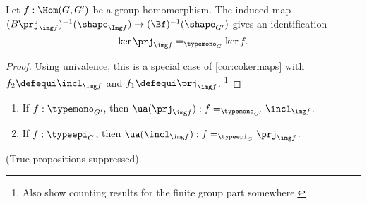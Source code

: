 \begin{lemma}
  \label{lem:kerandcoker}
  Let $f:\Hom(G,G')$ be a group homomorphism.
  The induced map $(B\prj_{\img f})^{-1}(\shape_{\Img f})\to (\Bf)^{-1}(\shape_{G'})$ gives an identification
  \[
    \ker\prj_{\img f}=_{\typemono_G} \ker f.
  \]
\end{lemma}
\begin{proof}
  Using univalence, this is a special case of \cref{cor:cokermaps} with $f_2\defequi\incl_{\img f}$ and $f_1\defequi\prj_{\img f}$.
  \footnote{\color{blue}
 Also show counting results for the finite group part somewhere.}
\end{proof}
\begin{xca}
  \begin{enumerate}
  \item If $f:\typemono_{G'}$, then $\ua(\prj_{\img f}):f=_{\typemono_{G'}}\incl_{\img f}$.
  \item If $f:\typeepi_G$, then $\ua(\incl_{\img f}):f=_{\typeepi_{G}}\prj_{\img f}$.
  \end{enumerate}
(True propositions suppressed).
\end{xca}




